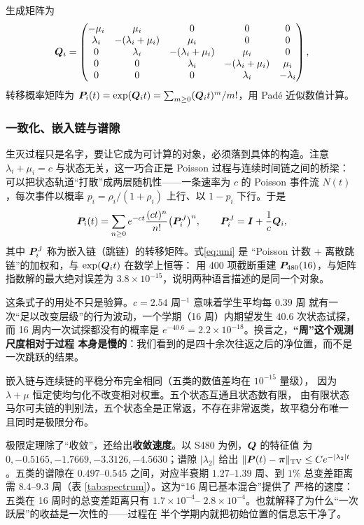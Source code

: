 生成矩阵为
\begin{equation}
\bm{Q}_i=\begin{pmatrix}
-\mu_i & \mu_i & 0 & 0 & 0\\
\lambda_i & -(\lambda_i+\mu_i) & \mu_i & 0 & 0\\
0 & \lambda_i & -(\lambda_i+\mu_i) & \mu_i & 0\\
0 & 0 & \lambda_i & -(\lambda_i+\mu_i) & \mu_i\\
0 & 0 & 0 & \lambda_i & -\lambda_i
\end{pmatrix},
\label{eq:Q}
\end{equation}
转移概率矩阵为 $\bm{P}_i(t)=\exp(\bm{Q}_i t)=\sum_{m\ge0}(\bm{Q}_i t)^m/m!$，用
Padé 近似数值计算。

\subsubsection{一致化、嵌入链与谱隙}

生灭过程只是名字，要让它成为可计算的对象，必须落到具体的构造。注意
$\lambda_i+\mu_i=c$ 与状态无关，这一巧合正是 Poisson 过程与连续时间链之间的桥梁：
可以把状态轨道“打散”成两层随机性——一条速率为 $c$ 的 Poisson 事件流
$N(t)$，每次事件以概率 $p_i=\rho_i/(1+\rho_i)$ 上行、以 $1-p_i$ 下行。于是
\begin{equation}
\bm{P}_i(t)=\sum_{n\ge0}e^{-ct}\frac{(ct)^{n}}{n!}\bigl(\bm{P}_i^{J}\bigr)^{n},
\qquad \bm{P}_i^{J}=\bm{I}+\frac{1}{c}\bm{Q}_i ,
\label{eq:uni}
\end{equation}
其中 $\bm{P}_i^{J}$ 称为嵌入链（跳链）的转移矩阵。式\eqref{eq:uni} 是
“Poisson 计数 + 离散跳链”的加权和，与 $\exp(\bm{Q}_i t)$ 在数学上恒等：
用 400 项截断重建 $\bm{P}_{480}(16)$，与矩阵指数解的最大绝对误差为
$3.8\times10^{-15}$，说明两种语言描述的是同一个对象。

这条式子的用处不只是验算。$c=2.54$ 周$^{-1}$ 意味着学生平均每 $0.39$ 周
就有一次“足以改变层级”的行为波动，一个学期（16 周）内期望发生
$40.6$ 次状态试探，而 16 周内一次试探都没有的概率是
$e^{-40.6}=2.2\times10^{-18}$。换言之，\textbf{“周”这个观测尺度相对于过程
本身是慢的}：我们看到的是四十余次往返之后的净位置，而不是一次跳跃的结果。

嵌入链与连续链的平稳分布完全相同（五类的数值差均在 $10^{-15}$ 量级），
因为 $\lambda+\mu$ 恒定使均匀化不改变相对权重。五个状态互通且状态数有限，
由有限状态马尔可夫链的判别法，五个状态全是正常返，不存在非常返类，故平稳分布唯一
且同时是极限分布。

极限定理除了“收敛”，还给出\textbf{收敛速度}。以 S480 为例，$\bm{Q}$ 的特征值
为 $0,-0.5165,-1.7669,-3.3126,-4.5630$；谱隙 $|\lambda_2|$ 给出
$\|\bm{P}(t)-\bm{\pi}\|_{\mathrm{TV}}\le C e^{-|\lambda_2|t}$。五类的谱隙在
$0.497$--$0.545$ 之间，对应半衰期 $1.27$--$1.39$ 周、到 $1\%$ 总变差距离
需 $8.4$--$9.3$ 周（表 \ref{tab:spectrum}）。这为“16 周已基本混合”提供了
严格的速度：五类在 16 周时的总变差距离只有 $1.7\times10^{-4}$--
$2.8\times10^{-4}$。也就解释了为什么“一次跃层”的收益是一次性的——过程在
半个学期内就把初始位置的信息忘干净了。

